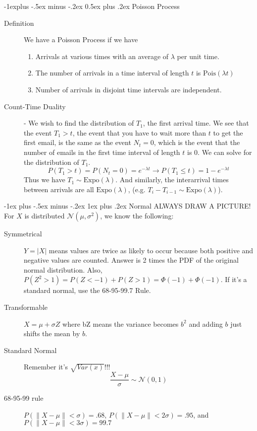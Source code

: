 \documentclass[10pt,landscape]{article}
\makeatletter
\theoremstyle{definition}
\newcommand{\N}{\mathcal{N}}
\newcommand{\Expo}{\textrm{Expo}}
\newcommand{\Pois}{\textrm{Pois}}
\renewcommand{\subsection}{\@startsection{subsection}{2}{0mm}%
                                {-1explus -.5ex minus -.2ex}%
                                {0.5ex plus .2ex}%
                                {\normalfont\normalsize\bfseries}}
\renewcommand{\subsubsection}{\@startsection{subsubsection}{3}{0mm}%
                                {-1ex plus -.5ex minus -.2ex}%
                                {1ex plus .2ex}%
                                {\normalfont\small\bfseries}}
\makeatother
\begin{document}
\begin{multicols}{3}
\subsection{Poisson Process}
\begin{description}
\item[Definition] We have a Poisson Process if we have 
\begin{enumerate}
    \item Arrivals at various times with an average of $\lambda$ per unit time.
    \item The number of arrivals in a time interval of length $t$ is $\Pois(\lambda t)$
    \item Number of arrivals in disjoint time intervals are independent.
\end{enumerate}
\item[Count-Time Duality] - We wish to find the distribution of $T_1$, the first arrival time. We see that the event $T_1 > t$, the event that you have to wait more than $t$ to get the first email, is the same as the event $N_t = 0$, which is the event that the number of emails in the first time interval of length $t$ is 0. We can solve for the distribution of $T_1$.
\[P(T_1 > t) = P(N_t = 0) = e^{-\lambda t} \longrightarrow P(T_1 \leq t) = 1 - e^{-\lambda t}\]
Thus we have $T_1 \sim \Expo(\lambda)$. And similarly, the interarrival times between arrivals are all $\Expo(\lambda)$, (e.g. $T_i - T_{i-1} \sim \Expo(\lambda)$).
\end{description}

\subsubsection{Normal}
ALWAYS DRAW A PICTURE! For $X$ is distributed $\N(\mu, \sigma^2)$, we know the following:
\begin{description}
	\item[Symmetrical] $Y=|X|$ means values are twice as likely to occur because both positive and negative values are counted. Answer is 2 times the PDF of the original normal distribution. Also, $P(Z^2>1)=P(Z<-1)+P(Z>1)=\Phi(-1)+\Phi(-1)$. If it's a standard normal, use the  68-95-99.7 Rule.
    \item[Transformable] $X=\mu + \sigma Z$ where bZ means the variance becomes $b^2$ and adding $b$ just shifts the mean by $b$. 
    \item[Standard Normal]Remember it's $\sqrt{Var(x)}$!!!
    \[\frac{X - \mu}{\sigma} \sim \N(0, 1) \]
	\item[68-95-99 rule] $P(\|X-\mu\| < \sigma) = .68$, $P(\|X-\mu\| < 2\sigma) = .95$, and $P(\|X-\mu\| < 3\sigma) = 99.7$
\end{description}


\end{multicols}
\end{document}

